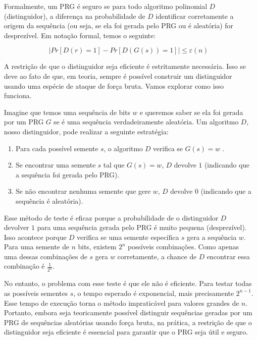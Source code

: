 Formalmente, um PRG é seguro se para todo algoritmo polinomial $D$ (distinguidor), a diferença na probabilidade de $D$ identificar corretamente a origem da sequência (ou seja, se ela foi gerada pelo PRG ou é aleatória) for desprezível.
Em notação formal, temos o seguinte:

\begin{displaymath}
  |Pr[D(r) = 1] - Pr[D(G(s)) = 1]| \leq \varepsilon(n)  
\end{displaymath}

A restrição de que o distinguidor seja eficiente é estritamente necessária.
Isso se deve ao fato de que, em teoria, sempre é possível construir um distinguidor usando uma espécie de ataque de força bruta.
Vamos explorar como isso funciona.

Imagine que temos uma sequência de bits $w$ e queremos saber se ela foi gerada por um PRG $G$  se é uma sequência verdadeiramente aleatória.
Um algoritmo $D$, nosso distinguidor, pode realizar a seguinte estratégia:

\begin{enumerate}
    \item Para cada possível semente $s$, o algoritmo $D$ verifica se $G(s) = w$  . 
    \item Se encontrar uma semente $s$ tal que $G(s) = w$, $D$ devolve $1$ (indicando que a sequência foi gerada pelo PRG).
    \item Se não encontrar nenhuma semente que gere $w$, $D$ devolve $0$ (indicando que a sequência é aleatória).
\end{enumerate}

Esse método de teste é eficaz porque a probabilidade de o distinguidor $D$ devolver $1$ para uma sequência gerada pelo PRG é muito pequena (desprezível).
Isso acontece porque $D$ verifica se uma semente específica $s$ gera a sequência $w$.
Para uma semente de $n$ bits, existem $2^n$ possíveis combinações.
Como apenas uma dessas combinações de $s$ gera $w$ corretamente, a chance de $D$ encontrar essa combinação é $\frac{1}{2^n}$.


No entanto, o problema com esse teste é que ele não é eficiente.
Para testar todas as possíveis sementes $s$, o tempo esperado é exponencial, mais precisamente $2^{n-1}$.
Esse tempo de execução torna o método impraticável para valores grandes de $n$.
Portanto, embora seja teoricamente possível distinguir sequências geradas por um PRG de sequências aleatórias usando força bruta, na prática, a restrição de que o distinguidor seja eficiente é essencial para garantir que o PRG seja útil e seguro.

